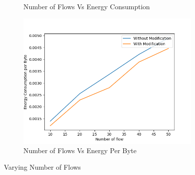 \begin{figure}[h]
\begin{subfigure}{.5\textwidth}
     \caption{Number of Flows Vs Energy Consumption}
     \label{flow_energy_modified}
\end{subfigure}
\begin{subfigure}{.5\textwidth}
  \centering
  \includegraphics[width=.8\linewidth]{modified_fig/NumberofFlowvsEnergyConsumptionperByte.png}
     \caption{Number of Flows Vs Energy Per Byte}
     \label{flow_energy_modified_per_byte}
\end{subfigure}
\caption{Varying Number of Flows}
\label{fig:varyingFlow}
\end{figure}


